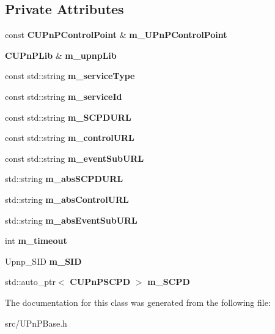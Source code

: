 \subsection*{Private Attributes}
\begin{DoxyCompactItemize}
\item 
const {\bf CUPnPControlPoint} \& {\bfseries m\_\-UPnPControlPoint}\label{classCUPnPService_a6e30549bf4dbfca54dd64a967701ff3d}

\item 
{\bf CUPnPLib} \& {\bfseries m\_\-upnpLib}\label{classCUPnPService_ad28d6e0adcc9dad3771d0219dba2550b}

\item 
const std::string {\bfseries m\_\-serviceType}\label{classCUPnPService_afa0d9a7b8c7c84e0295fe0f696001183}

\item 
const std::string {\bfseries m\_\-serviceId}\label{classCUPnPService_a364e1f71781f1cffd5c9b22d2af50c99}

\item 
const std::string {\bfseries m\_\-SCPDURL}\label{classCUPnPService_a3ce1f6eb9bf6113bddc01f7498f33d9a}

\item 
const std::string {\bfseries m\_\-controlURL}\label{classCUPnPService_a50546d827f0c16126c7517a132bb5856}

\item 
const std::string {\bfseries m\_\-eventSubURL}\label{classCUPnPService_a069fa8086808851e73cd824046e30310}

\item 
std::string {\bfseries m\_\-absSCPDURL}\label{classCUPnPService_aa297859adb221fe9dbb53267b8f09a0a}

\item 
std::string {\bfseries m\_\-absControlURL}\label{classCUPnPService_aa4e89036f6fd5e1aa9e7f12d34014784}

\item 
std::string {\bfseries m\_\-absEventSubURL}\label{classCUPnPService_a66987f9641c09df649105e210eedd0aa}

\item 
int {\bfseries m\_\-timeout}\label{classCUPnPService_a604582603caed07b824c2c4879492450}

\item 
Upnp\_\-SID {\bfseries m\_\-SID}\label{classCUPnPService_a5cae69ef313bacf78d1742d427d4e601}

\item 
std::auto\_\-ptr$<$ {\bf CUPnPSCPD} $>$ {\bfseries m\_\-SCPD}\label{classCUPnPService_ac7fd82c2e71368afd239f628faf85ac4}

\end{DoxyCompactItemize}


The documentation for this class was generated from the following file:\begin{DoxyCompactItemize}
\item 
src/UPnPBase.h\end{DoxyCompactItemize}
